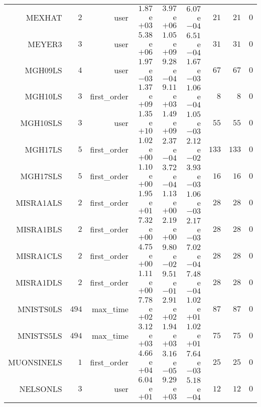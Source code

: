 \begin{longtable}{rrrrrrrrr}
MEXHAT & \(     2\) & user & \( 1.87\)e\(+03\) & \( 3.97\)e\(+06\) & \( 6.07\)e\(-04\) & \(    21\) & \(    21\) & \(     0\) \\
MEYER3 & \(     3\) & user & \( 5.38\)e\(+06\) & \( 1.05\)e\(+09\) & \( 6.51\)e\(-04\) & \(    31\) & \(    31\) & \(     0\) \\
MGH09LS & \(     4\) & user & \( 1.97\)e\(-03\) & \( 9.28\)e\(-04\) & \( 1.67\)e\(-03\) & \(    67\) & \(    67\) & \(     0\) \\
MGH10LS & \(     3\) & first\_order & \( 1.37\)e\(+09\) & \( 9.11\)e\(+03\) & \( 1.06\)e\(-04\) & \(     8\) & \(     8\) & \(     0\) \\
MGH10SLS & \(     3\) & user & \( 1.35\)e\(+10\) & \( 1.49\)e\(+09\) & \( 1.05\)e\(-03\) & \(    55\) & \(    55\) & \(     0\) \\
MGH17LS & \(     5\) & first\_order & \( 1.02\)e\(+00\) & \( 2.37\)e\(-04\) & \( 2.12\)e\(-02\) & \(   133\) & \(   133\) & \(     0\) \\
MGH17SLS & \(     5\) & first\_order & \( 1.10\)e\(+00\) & \( 3.72\)e\(-04\) & \( 3.93\)e\(-03\) & \(    16\) & \(    16\) & \(     0\) \\
MISRA1ALS & \(     2\) & first\_order & \( 1.95\)e\(+01\) & \( 1.13\)e\(+00\) & \( 1.06\)e\(-03\) & \(    28\) & \(    28\) & \(     0\) \\
MISRA1BLS & \(     2\) & first\_order & \( 7.32\)e\(+00\) & \( 2.19\)e\(+00\) & \( 2.17\)e\(-03\) & \(    28\) & \(    28\) & \(     0\) \\
MISRA1CLS & \(     2\) & first\_order & \( 4.75\)e\(+00\) & \( 9.80\)e\(-02\) & \( 7.02\)e\(-04\) & \(    28\) & \(    28\) & \(     0\) \\
MISRA1DLS & \(     2\) & first\_order & \( 1.11\)e\(+00\) & \( 9.51\)e\(-01\) & \( 7.48\)e\(-04\) & \(    28\) & \(    28\) & \(     0\) \\
MNISTS0LS & \(   494\) & max\_time & \( 7.78\)e\(+02\) & \( 2.91\)e\(+02\) & \( 1.02\)e\(+01\) & \(    87\) & \(    87\) & \(     0\) \\
MNISTS5LS & \(   494\) & max\_time & \( 3.12\)e\(+03\) & \( 1.94\)e\(+03\) & \( 1.02\)e\(+01\) & \(    75\) & \(    75\) & \(     0\) \\
MUONSINELS & \(     1\) & first\_order & \( 4.66\)e\(+04\) & \( 3.16\)e\(-05\) & \( 7.64\)e\(-03\) & \(    25\) & \(    25\) & \(     0\) \\
NELSONLS & \(     3\) & user & \( 6.04\)e\(+01\) & \( 9.29\)e\(+03\) & \( 5.18\)e\(-04\) & \(    12\) & \(    12\) & \(     0\) \\

\end{longtable}

